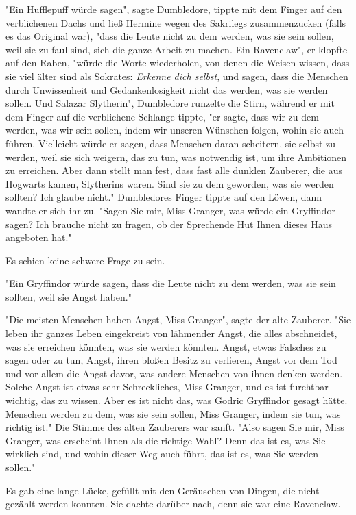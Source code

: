 {"Ein Hufflepuff würde sagen", sagte Dumbledore, tippte mit dem Finger auf den verblichenen Dachs und ließ Hermine wegen des Sakrilegs zusammenzucken (falls es das Original war), "dass die Leute nicht zu dem werden, was sie sein sollen, weil sie zu faul sind, sich die ganze Arbeit zu machen. Ein Ravenclaw", er klopfte auf den Raben, "würde die Worte wiederholen, von denen die Weisen wissen, dass sie viel älter sind als Sokrates: \emph{Erkenne dich selbst}, und sagen, dass die Menschen durch Unwissenheit und Gedankenlosigkeit nicht das werden, was sie werden sollen. Und Salazar Slytherin", Dumbledore runzelte die Stirn, während er mit dem Finger auf die verblichene Schlange tippte, "er sagte, dass wir zu dem werden, was wir sein sollen, indem wir unseren Wünschen folgen, wohin sie auch führen. Vielleicht würde er sagen, dass Menschen daran scheitern, sie selbst zu werden, weil sie sich weigern, das zu tun, was notwendig ist, um ihre Ambitionen zu erreichen. Aber dann stellt man fest, dass fast alle dunklen Zauberer, die aus Hogwarts kamen, Slytherins waren. Sind sie zu dem geworden, was sie werden sollten? Ich glaube nicht." Dumbledores Finger tippte auf den Löwen, dann wandte er sich ihr zu. "Sagen Sie mir, Miss Granger, was würde ein Gryffindor sagen? Ich brauche nicht zu fragen, ob der Sprechende Hut Ihnen dieses Haus angeboten hat."

Es schien keine schwere Frage zu sein.

"Ein Gryffindor würde sagen, dass die Leute nicht zu dem werden, was sie sein sollten, weil sie Angst haben."

"Die meisten Menschen haben Angst, Miss Granger", sagte der alte Zauberer. "Sie leben ihr ganzes Leben eingekreist von lähmender Angst, die alles abschneidet, was sie erreichen könnten, was sie werden könnten. Angst, etwas Falsches zu sagen oder zu tun, Angst, ihren bloßen Besitz zu verlieren, Angst vor dem Tod und vor allem die Angst davor, was andere Menschen von ihnen denken werden. Solche Angst ist etwas sehr Schreckliches, Miss Granger, und es ist furchtbar wichtig, das zu wissen. Aber es ist nicht das, was Godric Gryffindor gesagt hätte. Menschen werden zu dem, was sie sein sollen, Miss Granger, indem sie tun, was richtig ist." Die Stimme des alten Zauberers war sanft. "Also sagen Sie mir, Miss Granger, was erscheint Ihnen als die richtige Wahl? Denn das ist es, was Sie wirklich sind, und wohin dieser Weg auch führt, das ist es, was Sie werden sollen."

Es gab eine lange Lücke, gefüllt mit den Geräuschen von Dingen, die nicht gezählt werden konnten. Sie dachte darüber nach, denn sie war eine Ravenclaw.

}
